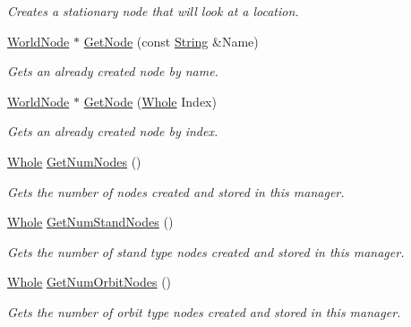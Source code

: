 \begin{DoxyCompactItemize}
\begin{DoxyCompactList}\small\item\em Creates a stationary node that will look at a location. \item\end{DoxyCompactList}\item 
\hyperlink{classphys_1_1WorldNode}{WorldNode} $\ast$ \hyperlink{classphys_1_1SceneManager_a23428c683adddabf9ab6650d8e95ac3c}{GetNode} (const \hyperlink{namespacephys_aa03900411993de7fbfec4789bc1d392e}{String} \&Name)
\begin{DoxyCompactList}\small\item\em Gets an already created node by name. \item\end{DoxyCompactList}\item 
\hyperlink{classphys_1_1WorldNode}{WorldNode} $\ast$ \hyperlink{classphys_1_1SceneManager_aa30beb1565c4a62f547495f6639e6ad5}{GetNode} (\hyperlink{namespacephys_a460f6bc24c8dd347b05e0366ae34f34a}{Whole} Index)
\begin{DoxyCompactList}\small\item\em Gets an already created node by index. \item\end{DoxyCompactList}\item 
\hyperlink{namespacephys_a460f6bc24c8dd347b05e0366ae34f34a}{Whole} \hyperlink{classphys_1_1SceneManager_a9b236739b4b524a282f84b58b524efa6}{GetNumNodes} ()
\begin{DoxyCompactList}\small\item\em Gets the number of nodes created and stored in this manager. \item\end{DoxyCompactList}\item 
\hyperlink{namespacephys_a460f6bc24c8dd347b05e0366ae34f34a}{Whole} \hyperlink{classphys_1_1SceneManager_ae0cf3beb3e8419c3385b53a3bd7dab8f}{GetNumStandNodes} ()
\begin{DoxyCompactList}\small\item\em Gets the number of stand type nodes created and stored in this manager. \item\end{DoxyCompactList}\item 
\hyperlink{namespacephys_a460f6bc24c8dd347b05e0366ae34f34a}{Whole} \hyperlink{classphys_1_1SceneManager_a5ad1eab41f98131cfdc359b5c2a73c72}{GetNumOrbitNodes} ()
\begin{DoxyCompactList}\small\item\em Gets the number of orbit type nodes created and stored in this manager. \item\end{DoxyCompactList}\item 

\end{DoxyCompactItemize}
